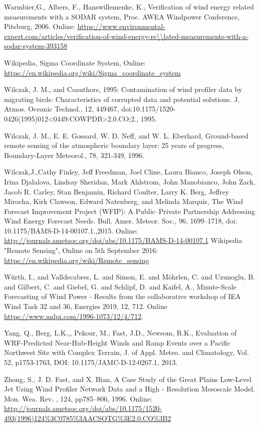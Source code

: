 Warmbier,G., Albers, F., Hanswillemenke, K., Verification of wind energy related measurements with a SODAR system, Proc. AWEA Windpower Conference, Pitsburg, 2006.
Online: \small{\url{https://www.environmental-expert.com/articles/verification-of-wind-energy-re\\lated-measurements-with-a-sodar-system-393158}}


Wikipedia, Sigma Coordinate System, Online:                          \small{\url{https://en.wikipedia.org/wiki/Sigma_coordinate_system}}


Wilczak, J. M., and Coauthors, 1995: Contamination of wind profiler data by migrating birds: Characteristics of corrupted data and potential solutions. J. Atmos.  Oceanic Technol., 12, 449­467, doi:10.1175/1520-0426(1995)012<0449:COWPDB>2.0.CO;2., 1995.


Wilczak, J. M., E. E. Gossard, W. D. Neff, and W. L. Eberhard, Ground-based remote sensing of the atmospheric boundary layer: 25 years of progress, Boundary-Layer Meteorol., 78, 321-349, 1996.


Wilczak,J.,Cathy Finley, Jeff Freedman, Joel Cline, Laura Bianco, Joseph Olson, Irina Djalalova, Lindsay Sheridan, Mark Ahlstrom, John Manobianco, John Zack, Jacob R. Carley, Stan Benjamin, Richard Coulter, Larry K. Berg, Jeffrey Mirocha, Kirk Clawson, Edward Natenberg, and Melinda Marquis,  The Wind Forecast Improvement Project (WFIP): A Public–Private Partnership Addressing Wind Energy Forecast Needs. Bull. Amer. Meteor. Soc., 96, 1699–1718, doi: 10.1175/BAMS-D-14-00107.1.,2015. Online: \small{\url{http://journals.ametsoc.org/doi/abs/10.1175/BAMS-D-14-00107.1}}
Wikipedia "Remote Sensing", Online on 5th September 2016: \small{\url{https://en.wikipedia.org/wiki/Remote_sensing}}


W{\"u}rth, I., and Valldecabres, L. and Simon, E. and M{\"o}hrlen, C. and Uzunoglu, B. and Gilbert, C. and Giebel, G. and Schlipf, D. and Kaifel, A., Minute-Scale Forecasting of Wind Power - Results from the collaborative workshop of IEA Wind Task 32 and 36, Energies 2019, 12, 712. Online \url{https://www.mdpi.com/1996-1073/12/4/712}.


Yang, Q., Berg, L.K.,, Pekour, M., Fast, J.D., Newsom, R.K., Evaluation of WRF-Predicted Near-Hub-Height Winds and Ramp Events over a Pacific Northwest Site with Complex Terrain, J. of Appl. Meteo. and Climatology, Vol. 52, p1753-1763, DOI: 10.1175/JAMC-D-12-0267.1, 2013.


Zhong, S., J. D. Fast, and X. Bian, A Case Study of the Great Plains Low-Level Jet Using Wind Profiler Network Data and a High - Resolution Mesoscale Model.  Mon. Wea. Rev.  , 124, pp785–806, 1996.
Online: \small{\url{http://journals.ametsoc.org/doi/abs/10.1175/1520-493(1996)124\%3C0785\%3AACSOTG\%3E2.0.CO\%3B2}}


